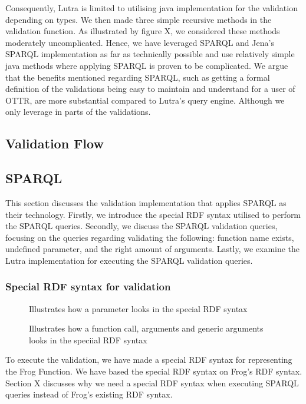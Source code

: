 \para
Consequently, Lutra is limited to utilising java implementation for the validation depending on types. We then made three simple recursive methods in the validation function. As illustrated by figure X, we considered these methods moderately uncomplicated. Hence, we have leveraged SPARQL and Jena's SPARQL implementation as far as technically possible and use relatively simple java methods where applying SPARQL is proven to be complicated. We argue that the benefits mentioned regarding SPARQL, such as getting a formal definition of the validations being easy to maintain and understand for a user of OTTR, are more substantial compared to Lutra's query engine. Although we only leverage in parts of the validations. 

\subsection{Validation Flow}

\subsection{SPARQL}
This section discusses the validation implementation that applies SPARQL as their technology. Firstly, we introduce the special RDF syntax utilised to perform the SPARQL queries. Secondly, we discuss the SPARQL validation queries, focusing on the queries regarding validating the following: function name exists, undefined parameter, and the right amount of arguments. Lastly, we examine the Lutra implementation for executing the SPARQL validation queries. 

\subsubsection{Special RDF syntax for validation}
\begin{figure}
  \begin{minipage}{.4\textwidth}
    
    \caption{Illustrates how a parameter looks in the special RDF syntax}
    \label{fig:specialRDF_parameter}
  \end{minipage}%
  \begin{minipage}{.5\textwidth}
    \centering
    
    \caption{Illustrates how a function call, arguments and generic arguments looks in the speciial RDF syntax}
    \label{fig:specialRDF_functionCall}
  \end{minipage}
\end{figure}
\begin{figure}
  
\end{figure}
To execute the validation, we have made a special RDF syntax for representing the Frog Function. We have based the special RDF syntax on Frog's RDF syntax. Section X discusses why we need a special RDF syntax when executing SPARQL queries instead of Frog's existing RDF syntax. 

